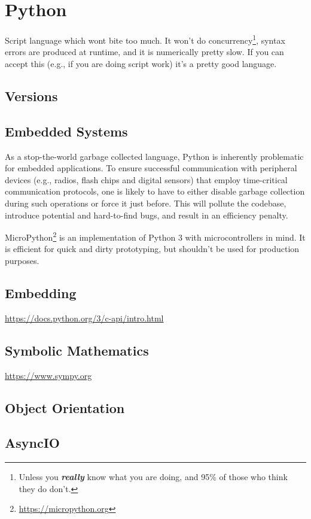 \section{Python}

Script language which wont bite too much. It won't do concurrency\footnote{Unless you \textsl{\textbf{really}} know what you are doing, and 95\% of those who think they do don't.}, syntax errors are produced at runtime, and it is numerically pretty slow. If you can accept this (e.g., if you are doing script work) it's a pretty good language.

\subsection{Versions}

\subsection{Embedded Systems}

As a stop-the-world garbage collected language, Python is inherently problematic for embedded applications. To ensure successful communication with peripheral devices (e.g., radios, flash chips and digital sensors) that employ time-critical communication protocols, one is likely to have to either disable garbage collection during such operations or force it just before. This will pollute the codebase, introduce potential and hard-to-find bugs, and result in an efficiency penalty.

MicroPython\footnote{\url{https://micropython.org}} is an implementation of Python 3 with microcontrollers in mind. It is efficient for quick and dirty prototyping, but shouldn't be used for production purposes.

\subsection{Embedding}


\url{https://docs.python.org/3/c-api/intro.html}


\subsection{Symbolic Mathematics}

\url{https://www.sympy.org}

\subsection{Object Orientation}

\subsection{AsyncIO}

